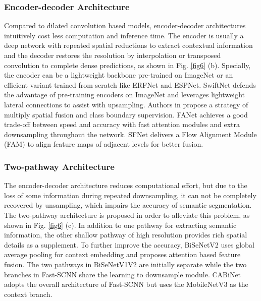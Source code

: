 \documentclass[journal]{IEEEtran}
\begin{document}
\subsubsection{Encoder-decoder Architecture}
Compared to dilated convolution based models, encoder-decoder architectures intuitively cost less computation and inference time.
The encoder is usually a deep network with repeated spatial reductions to extract contextual information and the decoder restores the resolution by interpolation or transposed convolution\cite{zeiler2010deconvolutional} to complete dense predictions, as shown in Fig. \ref{fig6} (b). Specially, the encoder can be a lightweight backbone pre-trained on ImageNet or an efficient variant trained from scratch like ERFNet\cite{romera2017erfnet} and ESPNet\cite{mehta2018espnet}. SwiftNet\cite{orsic2019defense} defends the advantage of pre-training encoders on ImageNet and leverages lightweight lateral connections to assist with upsampling. Authors in \cite{si2019real} propose a strategy of multiply spatial fusion and class boundary supervision. FANet \cite{hu2020real} achieves a good trade-off between speed and accuracy with fast attention modules and extra downsampling throughout the network. SFNet\cite{li2020semantic} delivers a Flow Alignment Module (FAM) to align feature maps of adjacent levels for better fusion.

\subsubsection{Two-pathway Architecture}

The encoder-decoder architecture reduces computational effort, but due to the loss of some information during repeated downsampling, it can not be completely recovered by unsampling, which impairs the accuracy of semantic segmentation. The two-pathway architecture is proposed in order to alleviate this problem\cite{yu2018bisenet}, as shown in Fig. \ref{fig6} (c). In addition to one pathway for extracting semantic information, the other shallow pathway of high resolution provides rich spatial details as a supplement. To further improve the accuracy, BiSeNetV2\cite{yu2020bisenet} uses global average pooling for context embedding and proposes attention based feature fusion. The two pathways in BiSeNetV1V2 are initially separate while the two branches in Fast-SCNN\cite{poudel2019fast} share the learning to downsample module. CABiNet\cite{kumaar2020cabinet} adopts the overall architecture of Fast-SCNN but uses the MobileNetV3\cite{howard2019searching} as the context branch. 
\end{document}
